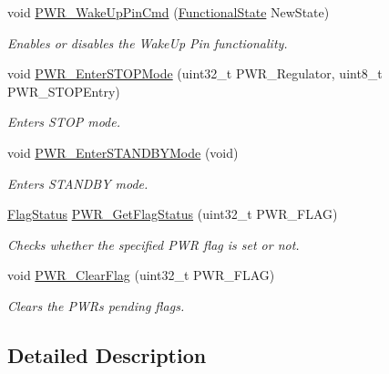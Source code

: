 \begin{DoxyCompactItemize}
void \mbox{\hyperlink{group___p_w_r___exported___functions_gae5fd6f9336ef8c60d5483651cb0d1a00}{P\+W\+R\+\_\+\+Wake\+Up\+Pin\+Cmd}} (\mbox{\hyperlink{group___exported__types_gac9a7e9a35d2513ec15c3b537aaa4fba1}{Functional\+State}} New\+State)
\begin{DoxyCompactList}\small\item\em Enables or disables the Wake\+Up Pin functionality. \end{DoxyCompactList}\item 
void \mbox{\hyperlink{group___p_w_r___exported___functions_ga694676ac06a9baf50eae45adae0118ab}{P\+W\+R\+\_\+\+Enter\+S\+T\+O\+P\+Mode}} (uint32\+\_\+t P\+W\+R\+\_\+\+Regulator, uint8\+\_\+t P\+W\+R\+\_\+\+S\+T\+O\+P\+Entry)
\begin{DoxyCompactList}\small\item\em Enters S\+T\+OP mode. \end{DoxyCompactList}\item 
void \mbox{\hyperlink{group___p_w_r___exported___functions_ga00ddae00a9c327b81b24d2597b0052f3}{P\+W\+R\+\_\+\+Enter\+S\+T\+A\+N\+D\+B\+Y\+Mode}} (void)
\begin{DoxyCompactList}\small\item\em Enters S\+T\+A\+N\+D\+BY mode. \end{DoxyCompactList}\item 
\mbox{\hyperlink{group___exported__types_ga89136caac2e14c55151f527ac02daaff}{Flag\+Status}} \mbox{\hyperlink{group___p_w_r___exported___functions_gaa980163a4d83304280ee34942464b4ec}{P\+W\+R\+\_\+\+Get\+Flag\+Status}} (uint32\+\_\+t P\+W\+R\+\_\+\+F\+L\+AG)
\begin{DoxyCompactList}\small\item\em Checks whether the specified P\+WR flag is set or not. \end{DoxyCompactList}\item 
void \mbox{\hyperlink{group___p_w_r___exported___functions_ga01c4b2fbd16514b993324e101c3ddf7c}{P\+W\+R\+\_\+\+Clear\+Flag}} (uint32\+\_\+t P\+W\+R\+\_\+\+F\+L\+AG)
\begin{DoxyCompactList}\small\item\em Clears the P\+WR\textquotesingle{}s pending flags. \end{DoxyCompactList}\end{DoxyCompactItemize}


\subsection{Detailed Description}


